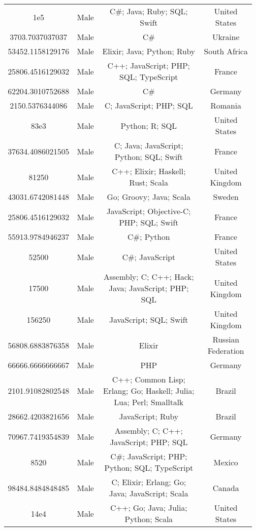 \begin{center}
\begin{tabular}{ |c|c|c|c| }
1e5  &  Male  &  C\#; Java; Ruby; SQL; Swift  &  United States  \\ 
3703.7037037037  &  Male  &  C\#  &  Ukraine  \\ 
53452.1158129176  &  Male  &  Elixir; Java; Python; Ruby  &  South Africa  \\ 
25806.4516129032  &  Male  &  C++; JavaScript; PHP; SQL; TypeScript  &  France  \\ 
62204.3010752688  &  Male  &  C\#  &  Germany  \\ 
2150.5376344086  &  Male  &  C; JavaScript; PHP; SQL  &  Romania  \\ 
83e3  &  Male  &  Python; R; SQL  &  United States  \\ 
37634.4086021505  &  Male  &  C; Java; JavaScript; Python; SQL; Swift  &  France  \\ 
81250  &  Male  &  C++; Elixir; Haskell; Rust; Scala  &  United Kingdom  \\ 
43031.6742081448  &  Male  &  Go; Groovy; Java; Scala  &  Sweden  \\ 
25806.4516129032  &  Male  &  JavaScript; Objective-C; PHP; SQL; Swift  &  France  \\ 
55913.9784946237  &  Male  &  C\#; Python  &  France  \\ 
52500  &  Male  &  C\#; JavaScript  &  United States  \\ 
17500  &  Male  &  Assembly; C; C++; Hack; Java; JavaScript; PHP; SQL  &  United Kingdom  \\ 
156250  &  Male  &  JavaScript; SQL; Swift  &  United Kingdom  \\ 
56808.6883876358  &  Male  &  Elixir  &  Russian Federation  \\ 
66666.6666666667  &  Male  &  PHP  &  Germany  \\ 
2101.91082802548  &  Male  &  C++; Common Lisp; Erlang; Go; Haskell; Julia; Lua; Perl; Smalltalk  &  Brazil  \\ 
28662.4203821656  &  Male  &  JavaScript; Ruby  &  Brazil  \\ 
70967.7419354839  &  Male  &  Assembly; C; C++; JavaScript; PHP; SQL  &  Germany  \\ 
8520  &  Male  &  C\#; JavaScript; PHP; Python; SQL; TypeScript  &  Mexico  \\ 
98484.8484848485  &  Male  &  C; Elixir; Erlang; Go; Java; JavaScript; Scala  &  Canada  \\ 
14e4  &  Male  &  C++; Go; Java; Julia; Python; Scala  &  United States  \\ 

\end{tabular}
\end{center}
